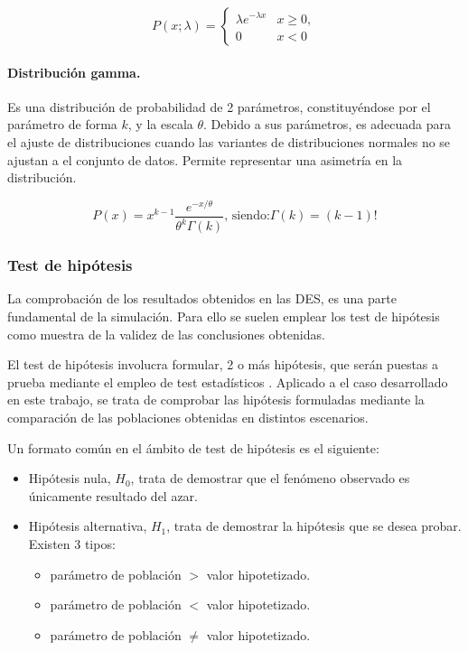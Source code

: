 \begin{equation}
	P(x; \lambda) =
	\begin{cases}
		\lambda e^{-\lambda x}	& x \geq 0, \\
		0										& x < 0
	\end{cases}
\end{equation}

\paragraph{Distribución gamma.} Es una distribución de probabilidad de
2 parámetros, constituyéndose por el parámetro de forma $k$,
y la escala $\theta$. Debido a sus parámetros,
es adecuada para el ajuste de distribuciones cuando las variantes
de distribuciones normales no se ajustan a el conjunto de datos.
Permite representar una asimetría en la distribución.

\begin{equation}
	P(x) = x^{k-1} \frac{e^{-x/\theta}}{\theta ^{k}\Gamma (k)}
	\text{, siendo:}
	\Gamma (k) = (k-1)!
\end{equation}

\subsubsection{Test de hipótesis}\label{sec_test_est}

La comprobación de los resultados obtenidos en las DES,
es una parte fundamental de la simulación.
Para ello se suelen emplear los test de hipótesis como muestra de la validez
de las conclusiones obtenidas.

El test de hipótesis involucra formular,
2 o más hipótesis, que serán puestas a prueba
mediante el empleo de test estadísticos \citep{martin2022introduction}.
Aplicado a el caso desarrollado en este trabajo,
se trata de comprobar las hipótesis formuladas
mediante la comparación de las poblaciones obtenidas en distintos escenarios.

Un formato común en el ámbito de test de hipótesis es el siguiente:

\begin{itemize}
	\item Hipótesis nula, $H_0$, trata de demostrar que el fenómeno observado es únicamente resultado del azar.
	\item Hipótesis alternativa, $H_1$, trata de demostrar la hipótesis que se desea probar. Existen 3 tipos:
		\begin{itemize}
			\item parámetro de población $>$ valor hipotetizado.
			\item parámetro de población $<$ valor hipotetizado.
			\item parámetro de población $\neq$ valor hipotetizado.
		\end{itemize}
\end{itemize}

